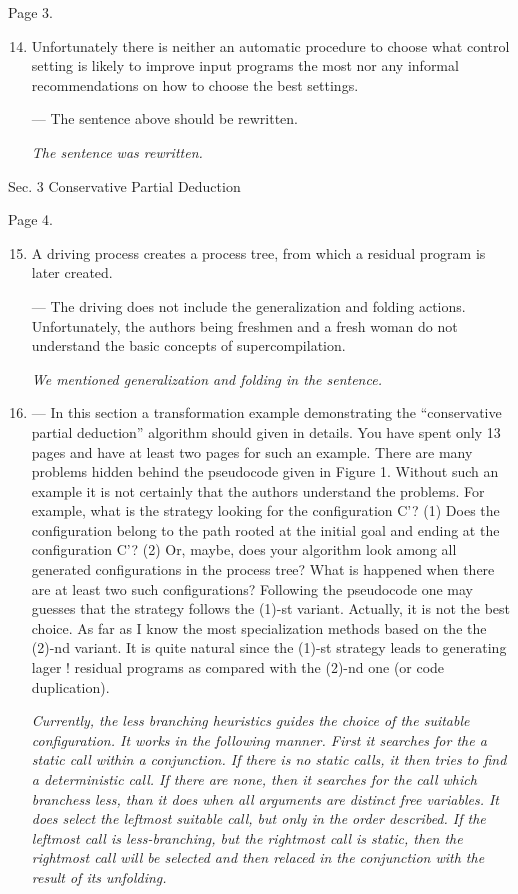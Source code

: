 Page 3.

\begin{enumerate}
  \setcounter{enumi}{13}
  \item { Unfortunately there is neither an automatic procedure to choose what control setting is likely to improve input programs the most nor any informal recommendations on how to choose the best settings.

  --- The sentence above should be rewritten.

  \emph{The sentence was rewritten.}
  }
\end{enumerate}

Sec. 3 Conservative Partial Deduction

Page 4.

\begin{enumerate}
  \setcounter{enumi}{14}
  \item { A driving process creates a process tree, from which a residual program is later created.

  --- The driving does not include the generalization and folding actions. Unfortunately, the authors being freshmen and a fresh woman do not understand the basic concepts of supercompilation.

  \emph{We mentioned generalization and folding in the sentence.}}

  \item { --- In this section a transformation example demonstrating the ``conservative partial deduction'' algorithm should given in details. You have spent only 13 pages and have at least two pages for such an example.  There are many problems hidden behind the pseudocode given in Figure 1. Without such an example it is not certainly that the authors understand the problems. For example, what is the strategy looking for the configuration C'? (1) Does the configuration belong to the path rooted at the initial goal and ending at the configuration C'? (2) Or, maybe, does your algorithm look among all generated configurations in the process tree? What is happened when there are at least two such configurations? Following the pseudocode one may guesses that the strategy follows the (1)-st variant. Actually, it is not the best choice. As far as I know the most specialization methods based on the the (2)-nd variant. It is quite natural since the (1)-st strategy leads to generating lager !
  residual programs as compared with the (2)-nd one (or code duplication).


  \emph{Currently, the less branching heuristics guides the choice of the suitable configuration. It works in the following manner. First it searches for the a static call within a conjunction. If there is no static calls, it then tries to find a deterministic call. If there are none, then it searches for the call which branchess less, than it does when all arguments are distinct free variables. It does select the leftmost suitable call, but only in the order described. If the leftmost call is less-branching, but the rightmost call is static, then the rightmost call will be selected and then relaced in the conjunction with the result of its unfolding. }
  }


\end{enumerate}
